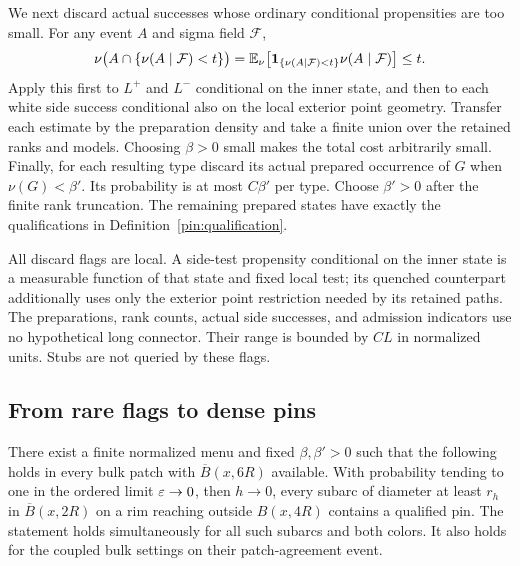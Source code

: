 We next discard actual successes whose ordinary conditional
propensities are too small.  For any event $A$ and sigma field
$\mathcal F$,
\begin{equation}\label{pin:small-propensity}
 \nu\bigl(A\cap\{\nu(A\mid\mathcal F)<t\}\bigr)
 =\mathbb E_\nu\bigl[\mathbf 1_{\{\nu(A\mid\mathcal F)<t\}}
                 \nu(A\mid\mathcal F)\bigr]\le t.
\end{equation}
Apply this first to $L^+$ and $L^-$ conditional on the inner state,
and then to each white side success conditional also on the local
exterior point geometry.  Transfer each estimate by the preparation
density and take a finite union over the retained ranks and models.
Choosing $\beta>0$ small makes the total cost arbitrarily small.
Finally, for each resulting type discard its actual prepared
occurrence of $G$ when $\nu(G)<\beta'$.  Its probability is at most
$C\beta'$ per type.  Choose $\beta'>0$ after the finite rank
truncation.  The remaining prepared states have exactly the
qualifications in Definition~\ref{pin:qualification}.

All discard flags are local.  A side-test propensity conditional on the
inner state is a measurable function of that state and fixed local
test; its quenched counterpart additionally uses only the exterior
point restriction needed by its retained paths.  The preparations,
rank counts, actual side successes, and admission indicators use no
hypothetical long connector.  Their range is bounded by $CL$ in
normalized units.  Stubs are not queried by these flags.

\subsection{From rare flags to dense pins}

\begin{proposition}\label{prop:dense-pins}
There exist a finite normalized menu and fixed $\beta,\beta'>0$ such
that the following holds in every bulk patch with
$\overline B(x,6R)$ available.  With probability tending to one in the
ordered limit $\varepsilon\to0$, then $h\to0$, every subarc of diameter at
least $r_h$ in $\overline B(x,2R)$ on a rim reaching outside
$B(x,4R)$ contains a qualified pin.  The statement holds simultaneously
for all such subarcs and both colors.  It also holds for the coupled
bulk settings on their patch-agreement event.
\end{proposition}

